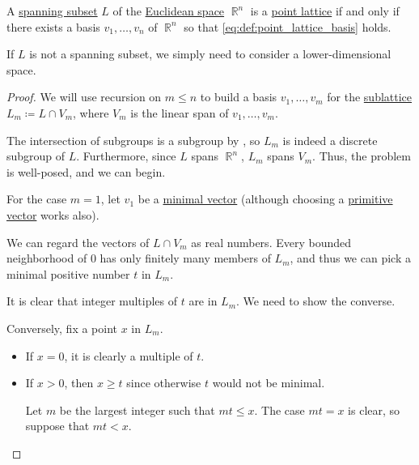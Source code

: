 \begin{proposition}\label{thm:point_lattice_via_basis}
  A \hyperref[def:semimodule/generated]{spanning subset} \( L \) of the \hyperref[def:euclidean_space]{Euclidean space} \( \BbbR^n \) is a \hyperref[def:point_lattice]{point lattice} if and only if there exists a basis \( v_1, \ldots, v_n \) of \( \BbbR^n \) so that \eqref{eq:def:point_lattice_basis} holds.
\end{proposition}
\begin{comments}
  \item If \( L \) is not a spanning subset, we simply need to consider a lower-dimensional space.
\end{comments}
\begin{proof}
  \SufficiencySubProof{} We will use recursion on \( m \leq n \) to build a basis \( v_1, \ldots, v_m \) for the \hyperref[def:point_sublattice]{sublattice} \( L_m \coloneqq L \cap V_m \), where \( V_m \) is the linear span of \( v_1, \ldots, v_m \).

  The intersection of subgroups is a subgroup by , so \( L_m \) is indeed a discrete subgroup of \( L \). Furthermore, since \( L \) spans \( \BbbR^n \), \( L_m \) spans \( V_m \). Thus, the problem is well-posed, and we can begin.

   For the case \( m = 1 \), let \( v_1 \) be a \hyperref[def:minimal_lattice_vector]{minimal vector} (although choosing a \hyperref[def:primitive_lattice_vector]{primitive vector} works also).

  We can regard the vectors of \( L \cap V_m \) as real numbers. Every bounded neighborhood of \( 0 \) has only finitely many members of \( L_m \), and thus we can pick a minimal positive number \( t \) in \( L_m \).

  It is clear that integer multiples of \( t \) are in \( L_m \). We need to show the converse.

  Conversely, fix a point \( x \) in \( L_m \).
  \begin{itemize}
    \item If \( x = 0 \), it is clearly a multiple of \( t \).
    \item If \( x > 0 \), then \( x \geq t \) since otherwise \( t \) would not be minimal.

    Let \( m \) be the largest integer such that \( mt \leq x \). The case \( mt = x \) is clear, so suppose that \( mt < x \).


\end{itemize}
\end{proof}
